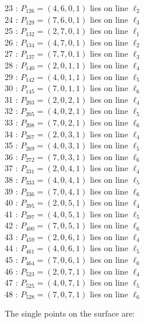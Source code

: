 \documentclass{article}
\begin{document}
{\begin{multicols}{2}
23 : $P_{126}=( 4, 6, 0, 1 )$ lies on line $\ell_{2}$\\
24 : $P_{129}=( 7, 6, 0, 1 )$ lies on line $\ell_{3}$\\
25 : $P_{132}=( 2, 7, 0, 1 )$ lies on line $\ell_{1}$\\
26 : $P_{134}=( 4, 7, 0, 1 )$ lies on line $\ell_{2}$\\
27 : $P_{137}=( 7, 7, 0, 1 )$ lies on line $\ell_{3}$\\
28 : $P_{140}=( 2, 0, 1, 1 )$ lies on line $\ell_{4}$\\
29 : $P_{142}=( 4, 0, 1, 1 )$ lies on line $\ell_{5}$\\
30 : $P_{145}=( 7, 0, 1, 1 )$ lies on line $\ell_{6}$\\
31 : $P_{203}=( 2, 0, 2, 1 )$ lies on line $\ell_{4}$\\
32 : $P_{205}=( 4, 0, 2, 1 )$ lies on line $\ell_{5}$\\
33 : $P_{208}=( 7, 0, 2, 1 )$ lies on line $\ell_{6}$\\
34 : $P_{267}=( 2, 0, 3, 1 )$ lies on line $\ell_{4}$\\
35 : $P_{269}=( 4, 0, 3, 1 )$ lies on line $\ell_{5}$\\
36 : $P_{272}=( 7, 0, 3, 1 )$ lies on line $\ell_{6}$\\
37 : $P_{331}=( 2, 0, 4, 1 )$ lies on line $\ell_{4}$\\
38 : $P_{333}=( 4, 0, 4, 1 )$ lies on line $\ell_{5}$\\
39 : $P_{336}=( 7, 0, 4, 1 )$ lies on line $\ell_{6}$\\
40 : $P_{395}=( 2, 0, 5, 1 )$ lies on line $\ell_{4}$\\
41 : $P_{397}=( 4, 0, 5, 1 )$ lies on line $\ell_{5}$\\
42 : $P_{400}=( 7, 0, 5, 1 )$ lies on line $\ell_{6}$\\
43 : $P_{459}=( 2, 0, 6, 1 )$ lies on line $\ell_{4}$\\
44 : $P_{461}=( 4, 0, 6, 1 )$ lies on line $\ell_{5}$\\
45 : $P_{464}=( 7, 0, 6, 1 )$ lies on line $\ell_{6}$\\
46 : $P_{523}=( 2, 0, 7, 1 )$ lies on line $\ell_{4}$\\
47 : $P_{525}=( 4, 0, 7, 1 )$ lies on line $\ell_{5}$\\
48 : $P_{528}=( 7, 0, 7, 1 )$ lies on line $\ell_{6}$\\
\end{multicols}
The single points on the surface are:\\
}
\end{document}
